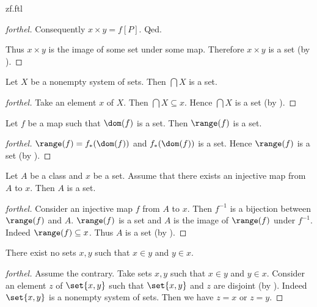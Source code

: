 \documentclass{naproche-library}
\begin{document}
\begin{smodule}{zf.ftl}
\begin{proof}[forthel]
      Consequently $x \times y = f[P]$.
    Qed.

    Thus $x \times y$ is the image of some set under some map.
    Therefore $x \times y$ is a set (by ).
  \end{proof}

  \begin{proposition}[forthel,id=FOUNDATIONS_10_5486815207227392,printid]
    Let $X$ be a nonempty system of sets.
    Then $\bigcap X$ is a set.
  \end{proposition}
  \begin{proof}[forthel]
    Take an element $x$ of $X$.
    Then $\bigcap X \subseteq x$.
    Hence $\bigcap X$ is a set (by ).
  \end{proof}

  \begin{proposition}[forthel,id=FOUNDATIONS_10_7598384349184000,printid]
    Let $f$ be a map such that $\dom(f)$ is a set.
    Then $\range(f)$ is a set.
  \end{proposition}
  \begin{proof}[forthel]
    $\range(f) = f_{*}(\dom(f))$ and $f_{*}(\dom(f))$ is a set.
    Hence $\range(f)$ is a set (by ).
  \end{proof}

  \begin{proposition}[forthel,id=FOUNDATIONS_10_8631339572002816,printid]
    Let $A$ be a class and $x$ be a set.
    Assume that there exists an injective map from $A$ to $x$.
    Then $A$ is a set.
  \end{proposition}
  \begin{proof}[forthel]
    Consider an injective map $f$ from $A$ to $x$.
    Then $f^{-1}$ is a bijection between $\range(f)$ and $A$.
    $\range(f)$ is a set and $A$ is the image of $\range(f)$ under $f^{-1}$.
    Indeed $\range(f) \subseteq x$.
    Thus $A$ is a set (by ).
  \end{proof}

  \begin{proposition}[forthel,id=FOUNDATIONS_10_8812282138066944,printid]
    There exist no sets $x, y$ such that $x \in y$ and $y \in x$.
  \end{proposition}
  \begin{proof}[forthel]
    Assume the contrary.
    Take sets $x,y$ such that $x \in y$ and $y \in x$.
    Consider an element $z$ of $\set{x,y}$ such that $\set{x,y}$ and $z$ are disjoint (by ).
    Indeed $\set{x,y}$ is a nonempty system of sets.
    Then we have $z = x$ or $z = y$.


\end{proof}
\end{smodule}
\end{document}
